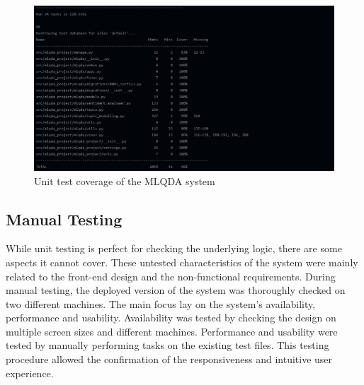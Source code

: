 \documentclass{l4proj}
\begin{document}
\begin{figure} [H]
    \centering
    \includegraphics[width=1\linewidth]{images/mlqda_coverage.png}
    \caption{Unit test coverage of the MLQDA system}
    \label{fig:mlqda-coverage} 
\end{figure}


\subsection{Manual Testing}
While unit testing is perfect for checking the underlying logic, there are some aspects it cannot cover. These untested characteristics of the system were mainly related to the front-end design and the non-functional requirements. During manual testing, the deployed version of the system was thoroughly checked on two different machines. The main focus lay on the system's availability, performance and usability. Availability was tested by checking the design on multiple screen sizes and different machines. Performance and usability were tested by manually performing tasks on the existing test files. This testing procedure allowed the confirmation of the responsiveness and intuitive user experience.
\end{document}
